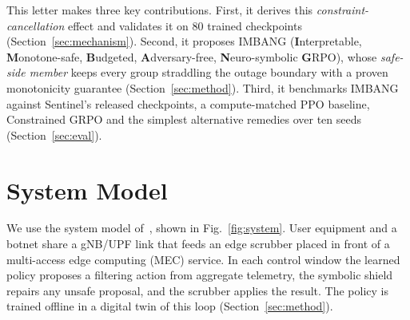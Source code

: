 \documentclass[journal]{IEEEtran}
\begin{document}
\begin{table}[t]
\centering
\caption{Treatment of the Outage Constraint by Related Approaches}
\label{tab:related}
\setlength{\tabcolsep}{2.5pt}
\end{table}

This letter makes three key contributions. First, it derives this \emph{constraint-cancellation} effect and validates it on 80 trained checkpoints (Section~\ref{sec:mechanism}). Second, it proposes IMBANG (\textbf{I}nterpretable, \textbf{M}onotone-safe, \textbf{B}udgeted, \textbf{A}dversary-free, \textbf{N}euro-symbolic \textbf{G}RPO), whose \emph{safe-side member} keeps every group straddling the outage boundary with a proven monotonicity guarantee (Section~\ref{sec:method}). Third, it benchmarks IMBANG against Sentinel's released checkpoints, a compute-matched PPO baseline, Constrained GRPO and the simplest alternative remedies over ten seeds (Section~\ref{sec:eval}).

\section{System Model}
\label{sec:system}

We use the system model of~\cite{alfatemi2026sentinel}, shown in Fig.~\ref{fig:system}. User equipment and a botnet share a gNB/UPF link that feeds an edge scrubber placed in front of a multi-access edge computing (MEC) service. In each control window the learned policy proposes a filtering action from aggregate telemetry, the symbolic shield repairs any unsafe proposal, and the scrubber applies the result. The policy is trained offline in a digital twin of this loop (Section~\ref{sec:method}).
\end{document}
